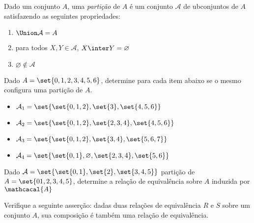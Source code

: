 \begin{definition}[Partição]
Dado um conjunto $A$, uma \emph{partição} de $A$ é um conjunto $\mathcal{A}$ de ubconjuntos de $A$ satisfazendo as seguintes propriedades:
\begin{enumerate}[i]
  \item $\Union \mathcal{A} = A$
  \item para todos $X,Y \in \mathcal{A}$, $X \inter Y = \varnothing$
  \item $\varnothing \not\in \mathcal{A}$
\end{enumerate}
\end{definition}

\begin{exercise}
Dado $A = \set{0,1,2,3,4,5,6}$, determine para cada item abaixo se o mesmo configura uma partição de $A$.

\begin{itemize}
  \item $\mathcal{A}_1 = \set{\set{0,1,2},\set{3},\set{4,5,6}}$
  \item $\mathcal{A}_2 = \set{\set{0,1,2},\set{2,3,4},\set{4,5,6}}$
  \item $\mathcal{A}_3 = \set{\set{0,1,2},\set{3,4},\set{5,6,7}}$
  \item $\mathcal{A}_4 = \set{\set{0,1},\varnothing,\set{2,3,4},\set{5,6}}$
\end{itemize}
\end{exercise}

\begin{exercise}
Dado $\mathcal{A} = \set{\set{0,1},\set{2},\set{3,4,5}}$ partição de $A = \set{01,2,3,4,5}$, determine a relação de equivalência sobre $A$ induzida por $\mathcacal{A}$
\end{exercise}


\begin{exercise}
Verifique a seguinte asserção: dadas duas relações de equivalência $R$ e $S$ sobre um conjunto $A$, sua composição é também uma relação de equivalência.
\end{exercise}
